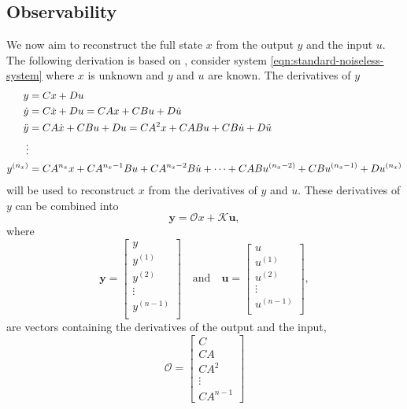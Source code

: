\subsection{Observability}
We now aim to reconstruct the full state $x$ from the output $y$ and the input $u$. The following derivation is based on \cite{StephenBoyd2009LectureEstimation}, consider system \eqref{eqn:standard-noiseless-system} where $x$ is unknown and $y$ and $u$ are known. The derivatives of $y$ 
\[
\begin{split}
y &= Cx + Du \\
\dot{y} &= C\dot{x} + Du =  CAx + CBu + D\dot{u} \\
\Ddot{y} &= CA\dot{x} + CBu + Du = CA^{2}x + CABu + CB\dot{u} + D\Ddot{u} \\
\vdots \\
y^{(n_x)} &= CA^{n_x}x + CA^{n_x-1}Bu + CA^{n_x-2}B\dot{u} + \dots + CABu^{(n_x-2)} + CBu^{(n_x-1)} + Du^{(n_x)}
\end{split}
\]
will be used to reconstruct $x$ from the derivatives of $y$ and $u$. These derivatives of $y$ can be combined into
\[ \mathbf{y} =  \mathcal{O}x + \mathcal{K}\mathbf{u}
,\]
where
\[\mathbf{y}=
\begin{bmatrix}
    y \\
    y^{(1)} \\
    y^{(2)} \\
    \vdots \\
    y^{(n-1)} \\
\end{bmatrix} \quad \text{and} \quad
\mathbf{u} = 
\begin{bmatrix}
    u \\
    u^{(1)} \\
    u^{(2)} \\
    \vdots \\
    u^{(n-1)} \\
\end{bmatrix},
\]
are vectors containing the derivatives of the output and the input,
\begin{equation}\label{eqn:observability-matrix}
    \mathcal{O}=
    \begin{bmatrix}
        C \\
        CA \\
        CA^2 \\
        \vdots \\
        CA^{n-1}
    \end{bmatrix}    
\end{equation}


